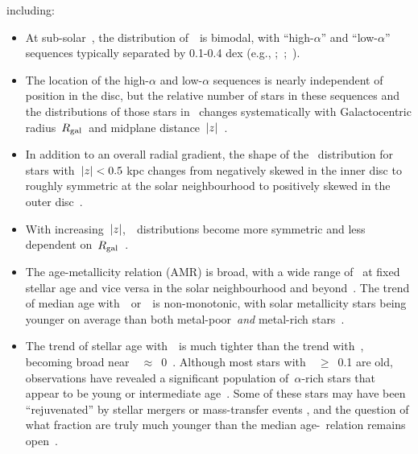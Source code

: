 \documentclass[draft2.tex]{subfiles}
\begin{document}
including: 
\begin{itemize} 
	\item At sub-solar~\feh, the distribution of~\afe~is bimodal, with 
	``high-$\alpha$'' and ``low-$\alpha$'' sequences typically separated by 
	0.1-0.4 dex (e.g., 
	\citealp{Fuhrmann1998};~\citealp*{Bensby2003};~\citealp{Adibekyan2012, 
	Vincenzo2021a}). 

	\item The location of the high-$\alpha$ and low-$\alpha$ sequences is 
	nearly independent of position in the disc, but the relative number of 
	stars in these sequences and the distributions of those stars in 
    \feh~changes systematically with Galactocentric radius~$R_\text{gal}$~and midplane 
	distance~$\left|z\right|$~\citep{Nidever2014, Hayden2015, Weinberg2019}. 

	\item In addition to an overall radial gradient, the shape of the 
	\feh~distribution for stars with~$\left|z\right| < 0.5$ kpc changes from negatively 
	skewed in the inner disc to roughly symmetric at the solar neighbourhood 
	to positively skewed in the outer disc~\citep{Hayden2015, Weinberg2019}. 

	\item With increasing~$\left|z\right|$,~\feh~distributions become more symmetric 
	and less dependent on~$R_\text{gal}$~\citep{Hayden2015}. 

	\item The age-metallicity relation (AMR) is broad, with a wide range of 
	\feh~at fixed stellar age and vice versa in the solar neighbourhood 
	\citep{Edvardsson1993} and beyond~\citep{Feuillet2019}. The trend of 
	median age with~\feh~or~\oh~is non-monotonic, with solar metallicity 
	stars being younger on average than both metal-poor~\textit{and} 
	metal-rich stars~\citep{Feuillet2018, Feuillet2019, Lu2021}. 

	\item The trend of stellar age with~\afe~is much tighter than the trend 
	with~\feh, becoming broad near~\afe~$\approx$~0~\citep{Feuillet2018, 
	Feuillet2019}. Although most stars with~\afe~$\geq$~0.1 are old, 
	observations have revealed a significant population of~$\alpha$-rich stars 
	that appear to be young or intermediate age~\citep{Chiappini2015, 
	Martig2015, Martig2016, Warfield2021}. Some of these stars may have been 
	``rejuvenated'' by stellar mergers or mass-transfer events 
	\citep{Jofre2016, Yong2016, Izzard2018, SilvaAguirre2018}, and 
	the question of what fraction are truly much younger than the median 
	age-\afe~relation remains open~\citep{Hekker2019, Miglio2021}. 
\end{itemize} 
\end{document}
